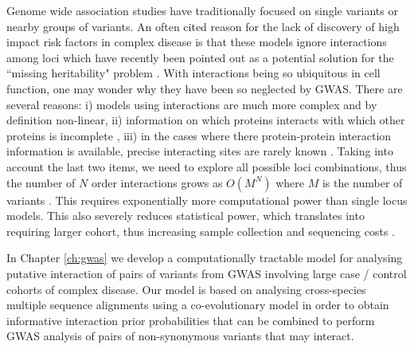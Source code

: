 Genome wide association studies have traditionally focused on single variants or nearby groups of variants. An often cited reason for the lack of discovery of high impact risk factors in complex disease is that these models ignore interactions among loci \cite{cordell2009detecting} which have recently been pointed out as a potential solution for the ``missing heritability" problem \cite{zuk2012mystery, zuk2014searching}. With interactions being so ubiquitous in cell function, one may wonder why they have been so neglected by GWAS. There are several reasons: i) models using interactions are much more complex \cite{gao2010classification} and by definition non-linear, ii) information on which proteins interacts with which other proteins is incomplete \cite{venkatesan2009empirical}, iii) in the cases where there protein-protein interaction information is available, precise interacting sites are rarely known \cite{venkatesan2009empirical}. Taking into account the last two items, we need to explore all possible loci combinations, thus the number of $N$ order interactions grows as $O(M^N)$ where $M$ is the number of variants \cite{de2013emerging}. This requires exponentially more computational power than single locus models. This also severely reduces statistical power, which translates into requiring larger cohort, thus increasing sample collection and sequencing costs \cite{de2013emerging}.

In Chapter \ref{ch:gwas} we develop a computationally tractable model for analysing putative interaction of pairs of variants from GWAS involving large case / control cohorts of complex disease. Our model is based on analysing cross-species multiple sequence alignments using a co-evolutionary model in order to obtain informative interaction prior probabilities that can be combined to perform GWAS analysis of pairs of non-synonymous variants that may interact.


%
%
%

